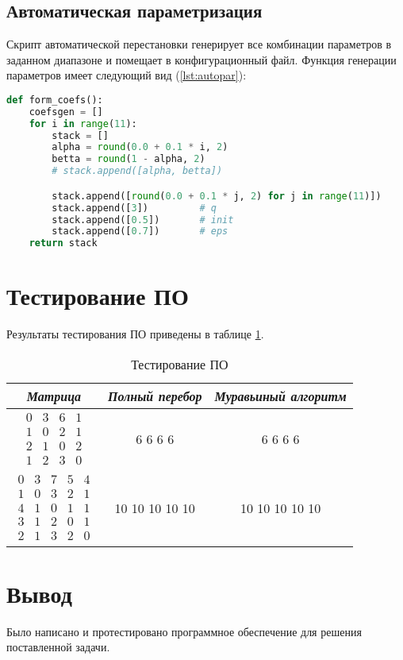     \subsection*{Автоматическая параметризация}

    Скрипт автоматической перестановки генерирует все комбинации параметров в заданном диапазоне и помещает в конфигурационный файл. Функция генерации параметров имеет следующий вид (\ref{lst:autopar}):

\begin{lstlisting}[language=Python, label=lst:autopar, caption=Реализация перемещений муравья]
def form_coefs():
    coefsgen = []
    for i in range(11):
        stack = []
        alpha = round(0.0 + 0.1 * i, 2)
        betta = round(1 - alpha, 2)
        # stack.append([alpha, betta])

        stack.append([round(0.0 + 0.1 * j, 2) for j in range(11)])
        stack.append([3])         # q
        stack.append([0.5])       # init
        stack.append([0.7])       # eps
    return stack
\end{lstlisting}
    \section{Тестирование ПО}
    Результаты тестирования ПО приведены в таблице \ref{table:testing}. 
\begin{table}[!h]
    \centering
    \caption{Тестирование ПО}
    \begin{tabular}{||c|c|c||}
        \hline
        \textit{Матрица} & \textit{Полный перебор} & \textit{Муравьиный алгоритм} \\ \hline\hline
        $\begin{matrix} 0 & 3 & 6 & 1 \\ 1 & 0 & 2 & 1 \\  2 & 1 & 0 & 2 \\ 1 & 2 & 3 & 0 \end{matrix}$ & 6 6 6 6 & 6 6 6 6 \\ \hline
        $ \begin{matrix} 0 & 3 & 7 & 5 & 4 \\ 1 & 0 & 3 & 2 & 1 \\ 4 & 1 & 0 & 1 & 1 \\ 3 & 1 & 2 & 0 & 1 \\ 2 & 1 & 3 & 2 & 0 \end{matrix}$ & 10 10 10 10 10 & 10 10 10 10 10 \\\hline
    \end{tabular}
    \label{table:testing}
\end{table}
\newpage
	\section*{Вывод}
	
	Было написано и протестировано программное обеспечение для решения поставленной задачи.
    	
\newpage